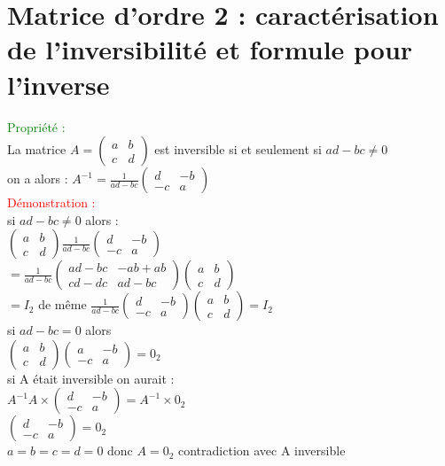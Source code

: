 \documentclass{article}
\begin{document}
	\section{ Matrice d'ordre 2 : caractérisation de l'inversibilité et formule pour l'inverse}
	\textcolor{green}{Propriété :} \\
	La matrice $A=\begin{pmatrix}
a & b \\
c & d
\end{pmatrix}$ est inversible si et seulement si $ad-bc \neq 0$ \\
 on a alors : $A^{-1}=\frac{1}{ad-bc}\begin{pmatrix}
d & -b \\
-c & a
\end{pmatrix}$ \\
\textcolor{red}{Démonstration :} \\
si $ad-bc \neq 0$ alors : \\
$\begin{pmatrix}
a & b \\
c & d
\end{pmatrix} \frac{1}{ad-bc}\begin{pmatrix}
d & -b \\
-c & a
\end{pmatrix}$  \\
$=\frac{1}{ad-bc}
\begin{pmatrix}
ad-bc & -ab+ab \\
cd-dc & ad-bc
\end{pmatrix} \begin{pmatrix}
a & b \\
c & d
\end{pmatrix}$ \\
$=I_2$ de même $\frac{1}{ad-bc}\begin{pmatrix} d & -b \\ -c & a \end{pmatrix}
\begin{pmatrix} a &b \\ c & d  \end{pmatrix} =I_2 $ \\
	si $ad-bc=0$ alors \\
	$\begin{pmatrix} a & b \\ c & d \end{pmatrix} \begin{pmatrix} a & -b \\ -c & a \end{pmatrix}=0_2$ \\
	si A était inversible on aurait : \\
	$A^{-1} A \times \begin{pmatrix} d & -b \\ -c & a \end{pmatrix} =A^{-1} \times 0_2 $ \\
	$\begin{pmatrix} d & -b \\ -c & a \end{pmatrix}=0_2$ \\
	$a=b=c=d=0$ donc $A=0_2$ contradiction avec A inversible
\end{document}
